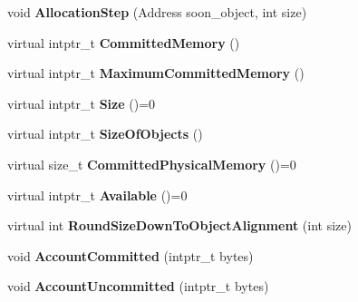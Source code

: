 \begin{DoxyCompactItemize}
\item 
void {\bfseries Allocation\+Step} (Address soon\+\_\+object, int size)\hypertarget{classv8_1_1internal_1_1_space_aa5bc1cc92224fee32273165ec7728748}{}\label{classv8_1_1internal_1_1_space_aa5bc1cc92224fee32273165ec7728748}

\item 
virtual intptr\+\_\+t {\bfseries Committed\+Memory} ()\hypertarget{classv8_1_1internal_1_1_space_a7fa41f713651e93e554d9d7e5bdffef9}{}\label{classv8_1_1internal_1_1_space_a7fa41f713651e93e554d9d7e5bdffef9}

\item 
virtual intptr\+\_\+t {\bfseries Maximum\+Committed\+Memory} ()\hypertarget{classv8_1_1internal_1_1_space_aaf244d4d7bb1aa01b5629a7b6e3080ee}{}\label{classv8_1_1internal_1_1_space_aaf244d4d7bb1aa01b5629a7b6e3080ee}

\item 
virtual intptr\+\_\+t {\bfseries Size} ()=0\hypertarget{classv8_1_1internal_1_1_space_a25fe1c34c782ee083846478f7e9191b1}{}\label{classv8_1_1internal_1_1_space_a25fe1c34c782ee083846478f7e9191b1}

\item 
virtual intptr\+\_\+t {\bfseries Size\+Of\+Objects} ()\hypertarget{classv8_1_1internal_1_1_space_a4aea0a53fc833a28da23de49fcff472d}{}\label{classv8_1_1internal_1_1_space_a4aea0a53fc833a28da23de49fcff472d}

\item 
virtual size\+\_\+t {\bfseries Committed\+Physical\+Memory} ()=0\hypertarget{classv8_1_1internal_1_1_space_aa1f4b42fba0c67f5dbf98230ac009b70}{}\label{classv8_1_1internal_1_1_space_aa1f4b42fba0c67f5dbf98230ac009b70}

\item 
virtual intptr\+\_\+t {\bfseries Available} ()=0\hypertarget{classv8_1_1internal_1_1_space_aa99d15640a90e0dacc03292191c2466e}{}\label{classv8_1_1internal_1_1_space_aa99d15640a90e0dacc03292191c2466e}

\item 
virtual int {\bfseries Round\+Size\+Down\+To\+Object\+Alignment} (int size)\hypertarget{classv8_1_1internal_1_1_space_a34965d2c93d16a1fd062d17512193153}{}\label{classv8_1_1internal_1_1_space_a34965d2c93d16a1fd062d17512193153}

\item 
void {\bfseries Account\+Committed} (intptr\+\_\+t bytes)\hypertarget{classv8_1_1internal_1_1_space_a61932f85bb4fe07213df009b3bd7c4ae}{}\label{classv8_1_1internal_1_1_space_a61932f85bb4fe07213df009b3bd7c4ae}

\item 
void {\bfseries Account\+Uncommitted} (intptr\+\_\+t bytes)\hypertarget{classv8_1_1internal_1_1_space_ac9844aca2d2c310ce66c2ae9e9518adf}{}\label{classv8_1_1internal_1_1_space_ac9844aca2d2c310ce66c2ae9e9518adf}

\end{DoxyCompactItemize}
